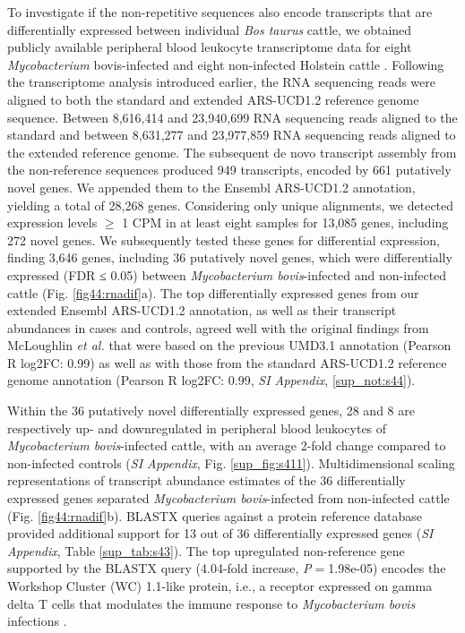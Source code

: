 \documentclass[../main.tex]{subfiles}
\begin{document}
To investigate if the non-repetitive sequences also encode transcripts that are differentially expressed between individual \emph{Bos taurus} cattle, we obtained publicly available peripheral blood leukocyte transcriptome data for eight \emph{Mycobacterium} bovis-infected and eight non-infected Holstein cattle \citep{mcloughlin2014rna}. Following the transcriptome analysis introduced earlier, the RNA sequencing reads were aligned to both the standard and extended ARS-UCD1.2 reference genome sequence. Between 8,616,414 and 23,940,699 RNA sequencing reads aligned to the standard and between 8,631,277 and 23,977,859 RNA sequencing reads aligned to the extended reference genome. The subsequent de novo transcript assembly from the non-reference sequences produced 949 transcripts, encoded by 661 putatively novel genes. We appended them to the Ensembl ARS-UCD1.2 annotation, yielding a total of 28,268 genes. Considering only unique alignments, we detected expression levels $≥$ 1 CPM in at least eight samples for 13,085 genes, including 272 novel genes. We subsequently tested these genes for differential expression, finding 3,646 genes, including 36 putatively novel genes, which were differentially expressed (FDR ≤ 0.05) between \emph{Mycobacterium bovis}-infected and non-infected cattle (Fig. \ref{fig44:rnadif}a). The top differentially expressed genes from our extended Ensembl ARS-UCD1.2 annotation, as well as their transcript abundances in cases and controls, agreed well with the original findings from McLoughlin \emph{et al.} that were based on the previous UMD3.1 annotation (Pearson R log2FC: 0.99) as well as with those from the standard ARS-UCD1.2 reference genome annotation (Pearson R log2FC: 0.99, \emph{SI Appendix}, \ref{sup_not:s44}). 


Within the 36 putatively novel differentially expressed genes, 28 and 8 are respectively up- and downregulated in peripheral blood leukocytes of \emph{Mycobacterium bovis}-infected cattle, with an average 2-fold change compared to non-infected controls (\emph{SI Appendix}, Fig. \ref{sup_fig:s411}). Multidimensional scaling representations of transcript abundance estimates of the 36 differentially expressed genes separated \emph{Mycobacterium bovis}-infected from non-infected cattle (Fig. \ref{fig44:rnadif}b). BLASTX queries against a protein reference database provided additional support for 13 out of 36 differentially expressed genes (\emph{SI Appendix}, Table \ref{sup_tab:s43}). The top upregulated non-reference gene supported by the BLASTX query (4.04-fold increase, \emph{P}$=$1.98e-05) encodes the Workshop Cluster (WC) 1.1-like protein, i.e., a receptor expressed on gamma delta T cells that modulates the immune response to \emph{Mycobacterium bovis} infections \citep{mcgill2014specific,damani2018variegated,kennedy2002modulation}. 
\end{document}

